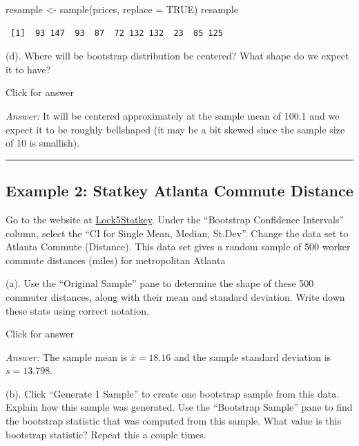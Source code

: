 \documentclass[
]{book}
\newenvironment{Shaded}{\begin{snugshade}}{\end{snugshade}}
\newcommand{\AttributeTok}[1]{\textcolor[rgb]{0.77,0.63,0.00}{#1}}
\newcommand{\ConstantTok}[1]{\textcolor[rgb]{0.00,0.00,0.00}{#1}}
\newcommand{\FunctionTok}[1]{\textcolor[rgb]{0.00,0.00,0.00}{#1}}
\newcommand{\NormalTok}[1]{#1}
\newcommand{\OtherTok}[1]{\textcolor[rgb]{0.56,0.35,0.01}{#1}}
\begin{document}
\begin{Shaded}
\begin{Highlighting}[]
\NormalTok{resample }\OtherTok{\textless{}{-}} \FunctionTok{sample}\NormalTok{(prices, }\AttributeTok{replace =} \ConstantTok{TRUE}\NormalTok{)}
\NormalTok{resample}
\end{Highlighting}
\end{Shaded}

\begin{verbatim}
 [1]  93 147  93  87  72 132 132  23  85 125
\end{verbatim}

(d). Where will be bootstrap distribution be centered? What shape do we expect it to have?

Click for answer

\emph{Answer:} It will be centered approximately at the sample mean of 100.1 and we expect it to be roughly bellshaped (it may be a bit skewed since the sample size of 10 is smallish).

\begin{center}\rule{0.5\linewidth}{0.5pt}\end{center}

\hypertarget{example-2-statkey-atlanta-commute-distance}{%
\subsection{Example 2: Statkey Atlanta Commute Distance}\label{example-2-statkey-atlanta-commute-distance}}

Go to the website at \href{http://www.lock5stat.com/StatKey/}{Lock5Statkey}. Under the ``Bootstrap Confidence Intervals'' column, select the ``CI for Single Mean, Median, St.Dev''. Change the data set to Atlanta Commute (Distance). This data set gives a random sample of 500 worker commute distances (miles) for metropolitan Atlanta

(a). Use the ``Original Sample'' pane to determine the shape of these 500 commuter distances, along with their mean and standard deviation. Write down these stats using correct notation.

Click for answer

\emph{Answer:} The sample mean is \(\bar{x} = 18.16\) and the sample standard deviation is \(s = 13.798\).

(b). Click ``Generate 1 Sample'' to create one bootstrap sample from this data. Explain how this sample was generated. Use the ``Bootstrap Sample'' pane to find the bootstrap statistic that was computed from this sample. What value is this bootstrap statistic? Repeat this a couple times.
\end{document}

